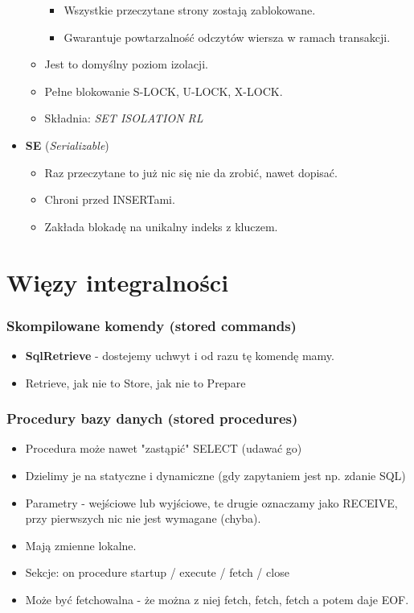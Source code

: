 \documentclass[a4paper,twoside]{article}
\begin{document}
\begin{itemize}
\begin{itemize}
\begin{itemize}
  				\item Wszystkie przeczytane strony zostają zablokowane.
  				\item Gwarantuje powtarzalność odczytów wiersza w ramach transakcji.
  			\end{itemize}
  			\item Jest to domyślny poziom izolacji.
  			\item Pełne blokowanie S-LOCK, U-LOCK, X-LOCK.
  			\item Składnia: {\emph{SET ISOLATION RL}}
  		\end{itemize}
  		\item \textbf{SE} (\emph{Serializable})
  		\begin{itemize}
  			\item Raz przeczytane to już nic się nie da zrobić, nawet dopisać.
  			\item Chroni przed INSERTami.
  			\item Zakłada blokadę na unikalny indeks z kluczem.
  		\end{itemize}
  	\end{itemize}
  	
  	
  	\part*{Więzy integralności}
  	
  	\section*{Skompilowane komendy (stored commands)}
  	\begin{itemize}
  		\item \textbf{SqlRetrieve} - dostejemy uchwyt i od razu tę komendę mamy.
  		\item Retrieve, jak nie to Store, jak nie to Prepare
  	\end{itemize}
  	\section*{Procedury bazy danych (stored procedures)}
  	\begin{itemize}
  		\item Procedura może nawet "zastąpić" SELECT (udawać go)
  		\item Dzielimy je na statyczne i dynamiczne (gdy zapytaniem jest np. zdanie SQL)
  		\item Parametry - wejściowe lub wyjściowe, te drugie oznaczamy jako RECEIVE, przy pierwszych nic nie jest wymagane (chyba).
  		\item Mają zmienne lokalne.
  		\item Sekcje: on procedure startup / execute / fetch / close
  		\item Może być fetchowalna - że można z niej fetch, fetch, fetch a potem daje EOF.
  	\end{itemize}
\end{document}
